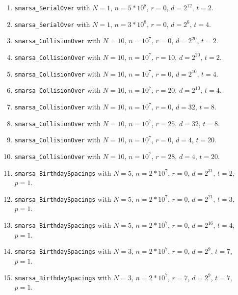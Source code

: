   \begin{enumerate}
  \item {\tt smarsa\_SerialOver} with $N=1$,  $n=5*10^8$,  $r=0$,
  $d = 2^{12}$, $t=2$.

  \item {\tt smarsa\_SerialOver} with $N=1$,  $n=3*10^8$,  $r=0$,
  $d = 2^6$, $t=4$.

  \item {\tt smarsa\_CollisionOver} with $N=10$,  $n=10^7$,  $r=0$,
  $d = 2^{20}$, $t=2$.

  \item {\tt smarsa\_CollisionOver} with $N=10$,  $n=10^7$,  $r=10$,
  $d = 2^{20}$,  $t=2$.

  \item {\tt smarsa\_CollisionOver} with $N=10$,  $n=10^7$,  $r=0$,
  $d = 2^{10}$, $t=4$.

  \item {\tt smarsa\_CollisionOver} with $N=10$,  $n=10^7$,  $r=20$,
  $d = 2^{10}$,  $t=4$.

  \item {\tt smarsa\_CollisionOver} with $N=10$,  $n=10^7$,  $r=0$,
  $d = 32$, $t=8$.

  \item {\tt smarsa\_CollisionOver} with $N=10$,  $n=10^7$,  $r=25$,
  $d = 32$,  $t=8$.

  \item {\tt smarsa\_CollisionOver} with $N=10$,  $n=10^7$,  $r=0$,
  $d = 4$, $t=20$.

  \item {\tt smarsa\_CollisionOver} with $N=10$,  $n=10^7$,  $r=28$,
  $d = 4$,  $t=20$.

  \item {\tt smarsa\_BirthdaySpacings}  with $N=5$,  $n=2*10^7$, $r=0$,
   $d = 2^{31}$, $t=2$, $p=1$.

  \item {\tt smarsa\_BirthdaySpacings}  with $N=5$,  $n=2*10^7$, $r=0$,
   $d = 2^{21}$, $t=3$, $p=1$.

  \item {\tt smarsa\_BirthdaySpacings}  with $N=5$,  $n=2*10^7$, $r=0$,
   $d = 2^{16}$, $t=4$, $p=1$.

  \item {\tt smarsa\_BirthdaySpacings}  with $N=3$,  $n=2*10^7$, $r=0$,
   $d = 2^{9}$, $t=7$, $p=1$.

  \item {\tt smarsa\_BirthdaySpacings}  with $N=3$,  $n=2*10^7$, $r=7$,
   $d = 2^{9}$, $t=7$, $p=1$.


\end{enumerate}
